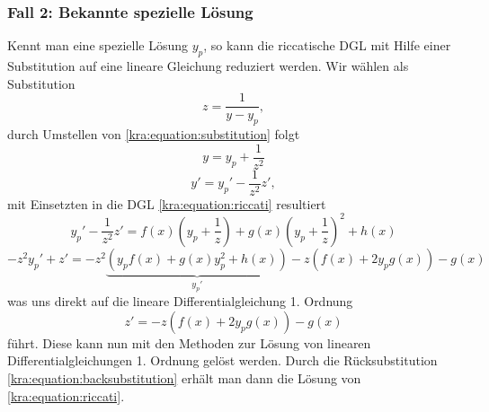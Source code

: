 \subsubsection{Fall 2: Bekannte spezielle Lösung}
Kennt man eine spezielle Lösung $y_p$, so kann die riccatische DGL mit Hilfe einer Substitution auf eine lineare Gleichung reduziert werden.
Wir wählen als Substitution
\begin{equation} \label{kra:equation:substitution}
    z = \frac{1}{y - y_p},
\end{equation}
durch Umstellen von \eqref{kra:equation:substitution} folgt
\begin{equation}
    y = y_p + \frac{1}{z^2} \label{kra:equation:backsubstitution}
\end{equation}
\begin{equation}
    y' = y_p' - \frac{1}{z^2}z',
\end{equation}
mit Einsetzten in die DGL \eqref{kra:equation:riccati} resultiert
\begin{equation}
    y_p' - \frac{1}{z^2}z' = f(x)(y_p + \frac{1}{z}) + g(x)(y_p + \frac{1}{z})^2 + h(x)
\end{equation}
\begin{equation}
    -z^{2}y_p' + z' = -z^2\underbrace{(y_{p}f(x) + g(x)y_p^2 + h(x))}_{\displaystyle{y_p'}} - z(f(x) + 2y_{p}g(x)) - g(x)
\end{equation}
was uns direkt auf die lineare Differentialgleichung 1. Ordnung
\begin{equation}
    z' = -z(f(x) + 2y_{p}g(x)) - g(x)
\end{equation}
führt.
Diese kann nun mit den Methoden zur Lösung von linearen Differentialgleichungen 1. Ordnung gelöst werden.
Durch die Rücksubstitution \eqref{kra:equation:backsubstitution} erhält man dann die Lösung von \eqref{kra:equation:riccati}.

